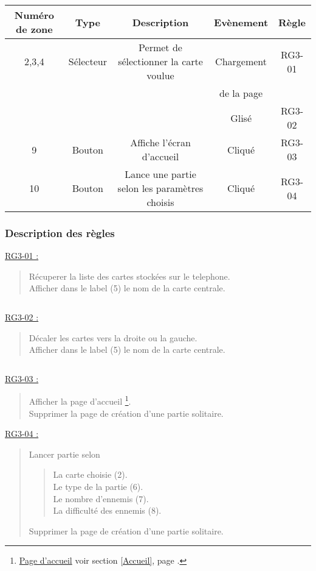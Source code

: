\documentclass{report}
\begin{document}
			\begin{tabular}{|c|c|c|c|c|} \hline
				Numéro de zone & Type  & Description & Evènement &	Règle \\\hline
				2,3,4 & Sélecteur & Permet de sélectionner la carte voulue & Chargement & RG3-01 \\
				      &           &                                        & de la page & \\
				      &           &                                        & Glisé    & RG3-02 \\\hline
				9 & Bouton & Affiche l'écran d'accueil & Cliqué & RG3-03 \\\hline
				10& Bouton & Lance une partie selon les paramètres choisis & Cliqué & RG3-04 \\\hline
			\end{tabular}

\newpage
			
		\subsubsection{Description des règles}

			\underline{RG3-01 :}
				\begin{quote}
					Récuperer la liste des cartes stockées sur le telephone.\\
					Afficher dans le label (5) le nom de la carte centrale.
				\end{quote}
			
			$\,$
				
			\underline{RG3-02 :}
				\begin{quote}
					Décaler les cartes vers la droite ou la gauche.\\
					Afficher dans le label (5) le nom de la carte centrale.
				\end{quote}

			$\,$

			\underline{RG3-03 :}
				\begin{quote}
					Afficher la page d'accueil%
						\footnote[1]{
							\hyperlink{Page d'accueil}{Page d'accueil}
							\og voir section \ref{Accueil}, page \pageref{Accueil}.\fg
						}.\\
					Supprimer la page de création d'une partie solitaire.\\
				\end{quote}


			\underline{RG3-04 :}
				\begin{quote}
					 Lancer partie selon
					 \begin{quote}
					 	La carte choisie (2).\\
					 	Le type de la partie (6).\\
					 	Le nombre d'ennemis (7).\\
					 	La difficulté des ennemis (8).
					 \end{quote}
					 Supprimer la page de création d'une partie solitaire.\\
				\end{quote}	
\end{document}
